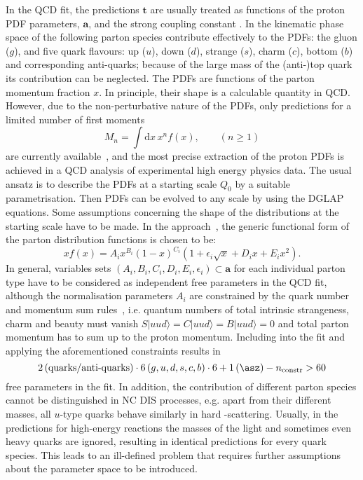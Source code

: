In the QCD fit, the predictions $\mathbf{t}$ are usually treated as functions of the proton PDF parameters, $\mathbf{a}$, and the strong coupling constant \asz. In the kinematic phase space of \hera the following parton species contribute effectively to the PDFs: the gluon ($g$), and five quark flavours: up ($u$), down ($d$), strange ($s$), charm ($c$), bottom ($b$) and corresponding anti-quarks; because of the large mass of the (anti-)top quark its contribution can be neglected. The PDFs are functions of the parton momentum fraction $x$. In principle, their shape is a calculable quantity in QCD. However, due to the non-perturbative nature of the PDFs, only predictions for a limited number of first moments 
\begin{equation}
 M_n=\int\mathrm{d}x\,x^n f\left(x\right), \qquad (n\ge1)
\end{equation}
are currently available~\cite{Hagler:2009ni}, and the most precise extraction of the proton PDFs is achieved in a QCD analysis of experimental high energy physics data. The usual ansatz is to describe the PDFs at a starting scale $Q_0$ by a suitable parametrisation. Then PDFs can be evolved to any scale by using the DGLAP equations. Some assumptions concerning the shape of the distributions at the starting scale have to be made. In the \herapdf approach~\cite{Aaron:2009aa}, the generic functional form of the parton distribution functions is chosen to be:
\begin{equation}
 xf\left(x\right) = A_ix^{B_i}\left(1-x\right)^{C_i}\left(1+\epsilon_i\sqrt{x}+D_ix+E_ix^2\right).
 \label{eq:pdfansatz}
\end{equation}
In general, variables sets $\left(A_i,B_i,C_i,D_i,E_i,\epsilon_i\right)\subset\mathbf{a}$ for each individual parton type have to be considered as independent free parameters in the QCD fit, although the normalisation parameters $A_i$ are constrained by the quark number and momentum sum rules~\cite{Yndurain:2006lfa}, i.e. quantum numbers of total intrinsic strangeness, charm and beauty must vanish $S|uud\rangle=C|uud\rangle=B|uud\rangle=0$ and total parton momentum has to sum up to the proton momentum. Including \asz into the fit and applying the aforementioned constraints results in 
\begin{equation}
2 \left( \text{quarks/anti-quarks}\right)\cdot 6\left(g,u,d,s,c,b\right)\cdot 6 + 1\left(\asz\right) - n_\text{constr} > 60
\end{equation}
free parameters in the fit. In addition, the contribution of different parton species cannot be distinguished in NC DIS processes, e.g. apart from their different masses, all $u$-type quarks behave similarly in hard \ep-scattering. Usually, in the predictions for high-energy reactions the masses of the light and sometimes even heavy quarks are ignored, resulting in identical predictions for every quark species. This leads to an ill-defined problem that requires further assumptions about the parameter space to be introduced. 

